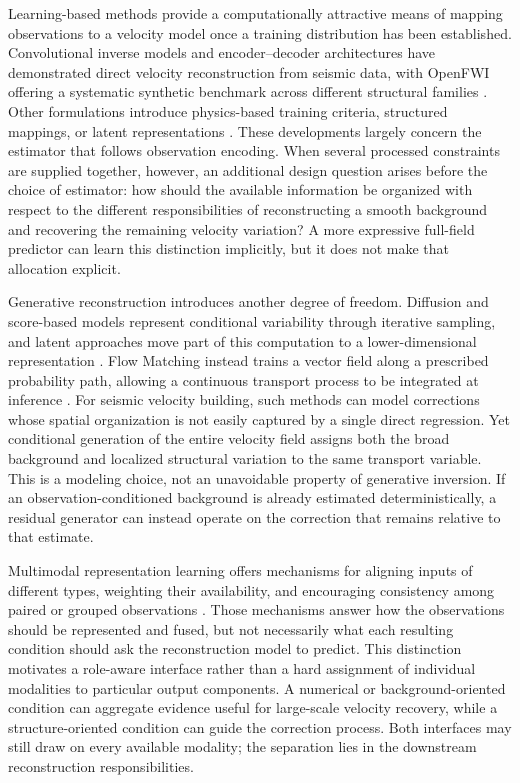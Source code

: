Learning-based methods provide a computationally attractive means of mapping observations to a velocity model once a training distribution has been established. Convolutional inverse models and encoder--decoder architectures have demonstrated direct velocity reconstruction from seismic data, with OpenFWI offering a systematic synthetic benchmark across different structural families \citep{yang2019deeplearning,wu2020inversionnet,deng2022openfwi}. Other formulations introduce physics-based training criteria, structured mappings, or latent representations \citep{jin2022upfwi,feng2024autolinear,gupta2025gfi}. These developments largely concern the estimator that follows observation encoding. When several processed constraints are supplied together, however, an additional design question arises before the choice of estimator: how should the available information be organized with respect to the different responsibilities of reconstructing a smooth background and recovering the remaining velocity variation? A more expressive full-field predictor can learn this distinction implicitly, but it does not make that allocation explicit.

Generative reconstruction introduces another degree of freedom. Diffusion and score-based models represent conditional variability through iterative sampling, and latent approaches move part of this computation to a lower-dimensional representation \citep{ho2020ddpm,song2021scorebased,rombach2022ldm}. Flow Matching instead trains a vector field along a prescribed probability path, allowing a continuous transport process to be integrated at inference \citep{lipman2023flowmatching,liu2023rectifiedflow}. For seismic velocity building, such methods can model corrections whose spatial organization is not easily captured by a single direct regression. Yet conditional generation of the entire velocity field assigns both the broad background and localized structural variation to the same transport variable. This is a modeling choice, not an unavoidable property of generative inversion. If an observation-conditioned background is already estimated deterministically, a residual generator can instead operate on the correction that remains relative to that estimate.

Multimodal representation learning offers mechanisms for aligning inputs of different types, weighting their availability, and encouraging consistency among paired or grouped observations \citep{baltrusaitis2019multimodal,tian2020cmc,saporta2024symile}. Those mechanisms answer how the observations should be represented and fused, but not necessarily what each resulting condition should ask the reconstruction model to predict. This distinction motivates a role-aware interface rather than a hard assignment of individual modalities to particular output components. A numerical or background-oriented condition can aggregate evidence useful for large-scale velocity recovery, while a structure-oriented condition can guide the correction process. Both interfaces may still draw on every available modality; the separation lies in the downstream reconstruction responsibilities.

